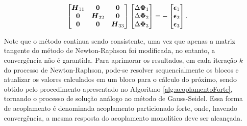 \begin{equation}
    \begin{bmatrix}
        \boldsymbol{H}_{11} & \boldsymbol{0}      & \boldsymbol{0}      \\
        \boldsymbol{0}      & \boldsymbol{H}_{22} & \boldsymbol{0}      \\
        \boldsymbol{0}      & \boldsymbol{0}      & \boldsymbol{H}_{33}
    \end{bmatrix}\begin{bmatrix}
        \Delta\boldsymbol{\Phi}_1 \\\Delta\boldsymbol{\Phi}_2\\\Delta\boldsymbol{\Phi}_3
    \end{bmatrix}=-\begin{bmatrix}
        \boldsymbol{\epsilon}_1 \\\boldsymbol{\epsilon}_2\\\boldsymbol{\epsilon}_3
    \end{bmatrix}\text{.}
\end{equation}

Note que o método continua sendo consistente, uma vez que apenas a matriz tangente do método de Newton-Raphson foi modificada, no entanto, a convergência não é garantida.
Para aprimorar os resultados, em cada iteração $k$ do processo de Newton-Raphson, pode-se resolver sequencialmente os blocos e atualizar os valores calculados em um bloco para o cálculo do próximo, sendo obtido pelo procedimento apresentado no Algoritmo \ref{alg:acoplamentoForte}, tornando o processo de solução análogo ao método de Gauss-Seidel. Essa forma de acoplamento é denominada acoplamento particionado forte, onde, havendo convergência, a mesma resposta do acoplamento monolítico deve ser alcançada.

